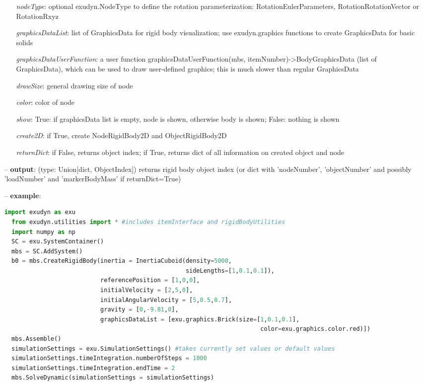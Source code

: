 \begin{itemize}[leftmargin=0.7cm]
\begin{itemize}[leftmargin=1.2cm]
\item[]{\it nodeType}: optional exudyn.NodeType to define the rotation parameterization: RotationEulerParameters, RotationRotationVector or RotationRxyz
\item[]{\it graphicsDataList}: list of GraphicsData for rigid body visualization; use exudyn.graphics functions to create GraphicsData for basic solids
\item[]{\it graphicsDataUserFunction}: a user function graphicsDataUserFunction(mbs, itemNumber)->BodyGraphicsData (list of GraphicsData), which can be used to draw user-defined graphics; this is much slower than regular GraphicsData
\item[]{\it drawSize}: general drawing size of node
\item[]{\it color}: color of node
\item[]{\it show}: True: if graphicsData list is empty, node is shown, otherwise body is shown; False: nothing is shown
\item[]{\it create2D}: if True, create NodeRigidBody2D and ObjectRigidBody2D
\item[]{\it returnDict}: if False, returns object index; if True, returns dict of all information on created object and node
\end{itemize}
\item[--]
{\bf output}: (type: Union[dict, ObjectIndex]) returns rigid body object index (or dict with 'nodeNumber', 'objectNumber' and possibly 'loadNumber' and 'markerBodyMass' if returnDict=True)
\item[--]
{\bf example}: \vspace{-12pt}\ei\begin{lstlisting}[language=Python, xleftmargin=36pt]
  import exudyn as exu
  from exudyn.utilities import * #includes itemInterface and rigidBodyUtilities
  import numpy as np
  SC = exu.SystemContainer()
  mbs = SC.AddSystem()
  b0 = mbs.CreateRigidBody(inertia = InertiaCuboid(density=5000,
                                                   sideLengths=[1,0.1,0.1]),
                           referencePosition = [1,0,0],
                           initialVelocity = [2,5,0],
                           initialAngularVelocity = [5,0.5,0.7],
                           gravity = [0,-9.81,0],
                           graphicsDataList = [exu.graphics.Brick(size=[1,0.1,0.1],
                                                                        color=exu.graphics.color.red)])
  mbs.Assemble()
  simulationSettings = exu.SimulationSettings() #takes currently set values or default values
  simulationSettings.timeIntegration.numberOfSteps = 1000
  simulationSettings.timeIntegration.endTime = 2
  mbs.SolveDynamic(simulationSettings = simulationSettings)
\end{lstlisting}\vspace{-24pt}\bi\item[]\vspace{-24pt}\vspace{12pt}\end{itemize}
%

